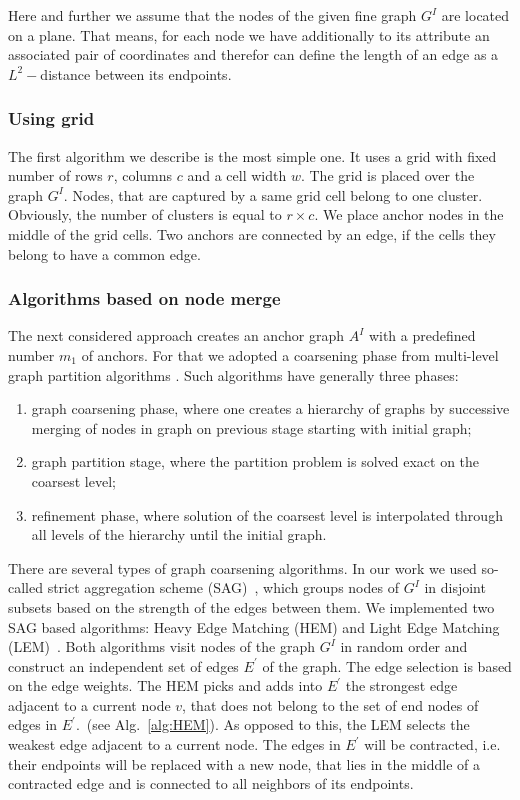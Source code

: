 Here and further we assume that the nodes of the given fine graph $G^I$ are located on a plane. That means, for each node we have additionally to its attribute an associated pair of coordinates and therefor can define the length of an edge as a $L^2-$distance between its endpoints. 
\subsubsection{Using grid}	
The first algorithm we describe is the most simple one. It uses a grid with fixed number of rows $r$, columns $c$ and a cell width $w$. The grid is placed over the graph $G^I$. Nodes, that are captured by a same grid cell belong to one cluster. Obviously, the number of clusters is equal to $r\times c$. We place anchor nodes in the middle of the grid cells. Two anchors are connected by an edge, if the cells they belong to have a common edge.
\subsubsection{Algorithms based on node merge} 
The next considered approach creates an anchor graph $A^I$ with a predefined number $m_1$ of anchors. For that we adopted a coarsening phase from multi-level graph partition algorithms \cite{Chevalier09_GP, Safro2012_GC, Karypis95_GP, Hendrickson1995}.
Such algorithms have generally three phases: 
\begin{enumerate}
	\item graph coarsening phase, where one creates a hierarchy of graphs by successive merging of nodes in graph on previous stage starting with initial graph;
	\item graph partition stage, where the partition problem is solved exact on the coarsest level;
	\item refinement phase, where solution of the coarsest level is interpolated through all levels of the hierarchy until the initial graph.
\end{enumerate}
There are several types of graph coarsening algorithms. In our work we used so-called strict aggregation scheme (SAG)~\cite{Chevalier09_GP}, which groups nodes of $G^I$ in disjoint subsets based on the strength of the edges between them. We implemented two SAG based algorithms: Heavy Edge Matching (HEM) and Light Edge Matching (LEM)~\cite{Chevalier09_GP}. Both algorithms visit nodes of the graph $G^I$ in random order and construct an independent set of edges $E^\prime$ of the graph. The edge selection is based on the edge weights. The HEM picks and adds into $E^\prime$ the strongest edge adjacent to a current node $v$, that does not belong to the set of end nodes of edges in $E^\prime$.~(see Alg.~\ref{alg:HEM}). As opposed to this, the LEM selects the weakest edge adjacent to a current node. The edges in $E^\prime$ will be contracted, i.e. their endpoints will be replaced with a new node, that lies in the middle of a contracted edge and is connected to all neighbors of its endpoints.


